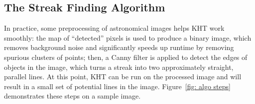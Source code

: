 \documentclass[DM,authoryear,toc]{lsstdoc}
\begin{document}
\subsection{The Streak Finding Algorithm}
\label{sec: algorithm}
In practice, some preprocessing of astronomical images helps KHT work smoothly: the map of ``detected'' pixels is used to produce a binary image, which removes background noise and significantly speeds up runtime by removing spurious clusters of points; then, a Canny filter is applied to detect the edges of objects in the image, which turns a streak into two approximately straight, parallel lines. At this point, KHT can be run on the processed image and will result in a small set of potential lines in the image. Figure~\ref{fig: algo steps} demonstrates these steps on a sample image.
\begin{figure}
\centering
{}
\qquad
{} \\
\qquad
{} \\

\end{figure}
\end{document}
